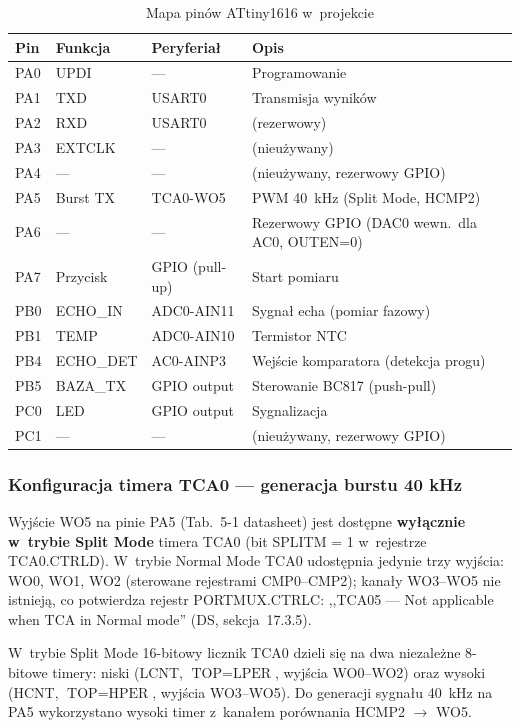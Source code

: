 \documentclass[a4paper,11pt]{article}
\begin{document}
	\begin{table}[H]
		\centering
		\caption{Mapa pinów ATtiny1616 w~projekcie}
		\label{tab:pinout}
		\begin{tabularx}{\textwidth}{l l l X}
			\toprule
			\textbf{Pin} & \textbf{Funkcja} & \textbf{Peryferiał} & \textbf{Opis} \\
			\midrule
			PA0 & UPDI & --- & Programowanie \\
			PA1 & TXD & USART0 & Transmisja wyników \\
			PA2 & RXD & USART0 & (rezerwowy) \\
			PA3 & EXTCLK & --- & (nieużywany) \\
			PA4 & --- & --- & (nieużywany, rezerwowy GPIO) \\
			PA5 & Burst TX & TCA0-WO5 & PWM \SI{40}{\kilo\hertz} (Split Mode, HCMP2) \\
			PA6 & --- & --- & Rezerwowy GPIO (DAC0 wewn.\ dla AC0, OUTEN=0) \\
			PA7 & Przycisk & GPIO (pull-up) & Start pomiaru \\
			PB0 & ECHO\_IN & ADC0-AIN11 & Sygnał echa (pomiar fazowy) \\
			PB1 & TEMP & ADC0-AIN10 & Termistor NTC \\
			PB4 & ECHO\_DET & AC0-AINP3 & Wejście komparatora (detekcja progu) \\
			PB5 & BAZA\_TX & GPIO output & Sterowanie BC817 (push-pull) \\
			PC0 & LED & GPIO output & Sygnalizacja \\
			PC1 & --- & --- & (nieużywany, rezerwowy GPIO) \\
			\bottomrule
		\end{tabularx}
	\end{table}
	
	\subsubsection{Konfiguracja timera TCA0 --- generacja burstu 40 kHz}
	
	Wyjście WO5 na pinie PA5 (Tab.~5-1 datasheet) jest dostępne \textbf{wyłącznie
		w~trybie Split Mode} timera TCA0 (bit SPLITM = 1 w~rejestrze TCA0.CTRLD).
	W~trybie Normal Mode TCA0 udostępnia jedynie trzy wyjścia: WO0, WO1, WO2
	(sterowane rejestrami CMP0--CMP2); kanały WO3--WO5 nie istnieją, co potwierdza
	rejestr PORTMUX.CTRLC: ,,TCA05 --- Not applicable when TCA in Normal mode''
	(DS, sekcja~17.3.5).
	
	W~trybie Split Mode 16-bitowy licznik TCA0 dzieli się na dwa niezależne
	8-bitowe timery: niski (LCNT, $\text{TOP} = \text{LPER}$, wyjścia WO0--WO2)
	oraz wysoki (HCNT, $\text{TOP} = \text{HPER}$, wyjścia WO3--WO5).
	Do generacji sygnału \SI{40}{\kilo\hertz} na PA5 wykorzystano wysoki timer
	z~kanałem porównania HCMP2 $\to$ WO5.
	
\end{document}
